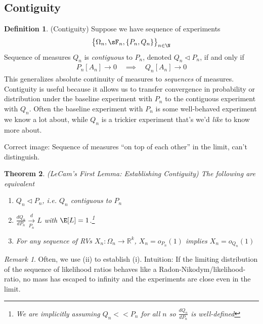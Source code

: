 \documentclass[12pt]{article}
\theoremstyle{plain}
\newtheorem{thm}{Theorem}[section]
\theoremstyle{definition}
\newtheorem{defn}[thm]{Definition}
\theoremstyle{remark}
\newtheorem*{rmk}{Remark}
\newcommand{\ra}{\rightarrow}
\newcommand{\Rk}{\mathbb{R}^k}
\newcommand{\dto}{\xrightarrow{d}}
\begin{document}
\clearpage
\subsection{Contiguity}

\begin{defn}(Contiguity)
Suppose we have sequence of experiments
\begin{align*}
  \big\{\Omega_n,\sF_n,\{P_n,Q_n\}\big\}_{n\in\N}
\end{align*}
Sequence of measures $Q_n$ is \emph{contiguous} to $P_n$, denoted $Q_n
\vartriangleleft P_n$, if and only if
\begin{align*}
  P_n[A_n]\ra 0
  \quad\implies\quad
  Q_n[A_n]\ra 0
\end{align*}
This generalizes absolute continuity of measures to \emph{sequences} of
measures.
Contiguity is useful because it allows us to transfer convergence in
probability or distribution under the baseline experiment with $P_n$ to
the contiguous experiment with $Q_n$. Often the baseline experiment with
$P_n$ is some well-behaved experiment we know a lot about, while $Q_n$
is a trickier experiment that's we'd \emph{like} to know more about.

Correct image: Sequence of measures ``on top of each other'' in the
limit, can't distinguish.
\end{defn}

\begin{thm}\emph{(LeCam's First Lemma: Establishing Contiguity)}
\label{thm:lecams1st}
The following are equivalent
\begin{enumerate}[label=\emph{(\roman*)}]
  \item $Q_n \vartriangleleft P_n$, i.e. $Q_n$ contiguous to $P_n$
  \item $\frac{dQ_n}{dP_n}\underset{P_n}{\dto} L$ with
    $\E[L]=1$.\footnote{%
      We are implicitly assuming $Q_n<<P_n$ for all $n$ so
      $\frac{dQ_n}{dP_n}$ is well-defined
    }
  \item For any sequence of RVs $X_n:\Omega_n\ra\Rk$,
    $X_n = o_{P_n}(1)$
    implies
    $X_n = o_{Q_n}(1)$
\end{enumerate}
\end{thm}
\begin{rmk}
Often, we use (ii) to establish (i).
Intuition: If the limiting distribution of the sequence of likelihood
ratios behaves like a Radon-Nikodym/likelihood-ratio, no mass has
escaped to infinity and the experiments are close even in the limit.
\end{rmk}
\end{document}
